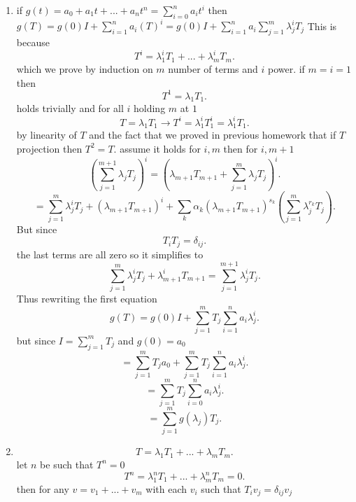 \documentclass{article}
\begin{document}
        \begin{enumerate}[label = (\alph*)]
            \item if $g(t) = a_0 + a_1t + ... + a_nt^{n} = \sum_{i=0}^{n}a_it^{i}$ then $g(T) = g(0)I + \sum_{i=1}^{n}a_i(T)^{i} = g(0)I + \sum_{i=1}^{n}a_i \sum_{j=1}^{m}\lambda_j^{i}T_j$
                This is because
                \[
                T^{i} = \lambda_1^{i}T_1 + ... + \lambda_m^{i}T_m
                .\] which we prove by induction on $m$ number of terms and $i$ power. if $m = i = 1$
                then
                \[
                T^{1} = \lambda_1T_1
                .\] 
                holds trivially
                and for all $i$ holding  $m$ at $1$
                 \[
                T= \lambda_1T_1 \rightarrow T^{i} = \lambda_1^{i}T_1^{i} = \lambda_1^{i}T_1
                .\] 
                by linearity of $T$ and the fact that we proved in previous homework that if $T$ projection then $T^2 = T$.
                assume it holds for $i,m$ then  for $i,m+1$
                \[
                    (\sum_{j=1}^{m+1}\lambda_jT_j)^{i} = (\lambda_{m+1}T_{m+1} + \sum_{j=1}^{m}\lambda_jT_j)^{i}
                .\] 
                \[
                    = \sum_{j=1}^{m}\lambda_j^{i}T_j + (\lambda_{m+1}T_{m+1})^{i} + \sum_{k}^{}\alpha_k(\lambda_{m+1}T_{m+1})^{s_k}(\sum_{j=1}^{m}\lambda_j^{r_k}T_j)
                .\] 
                But since
                \[
                    T_{i}T_{j} = \delta_{ij}
                .\] 
                the last terms are all zero so it simplifies to
                \[
                    \sum_{j=1}^{m}\lambda_j^{i}T_j + \lambda_{m+1}^{i}T_{m+1} = \sum_{j=1}^{m+1}\lambda_j^{i}T_j
                .\] 
                Thus rewriting the first equation
                \[
                g(T) = g(0)I + \sum_{j=1}^{m}T_j\sum_{i=1}^{n}a_i\lambda_j^{i}
                .\] 
                but since $I = \sum_{j=1}^{m}T_j$ and $g(0) = a_0$
                \[
                = \sum_{j=1}^{m}T_ja_0 + \sum_{j=1}^{m}T_j\sum_{i=1}^{n}a_i\lambda_j^{i}
                .\] 
                \[
                = \sum_{j=1}^{m}T_j\sum_{i=0}^{n}a_i\lambda_j^{i}
                .\] 
                \[
                = \sum_{j=1}^{m}g(\lambda_j)T_j
                .\] 
            \item 
                \[
                T = \lambda_1T_1 + ... + \lambda_mT_m
                .\] 
                let $n$ be such that $T^{n} = 0$
                \[
                T^{n} = \lambda_1^{n}T_1 + ... + \lambda_m^{n}T_m = 0
                .\] 
                then for any $v = v_1 + ... + v_m$ with each $v_i$ such that $T_iv_j = \delta_{ij}v_j$

\end{enumerate}
\end{document}
